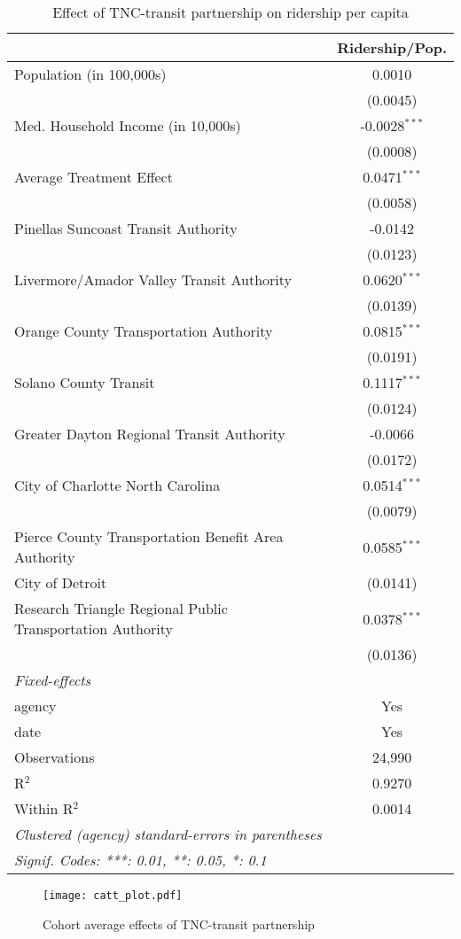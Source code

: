 \documentclass [12pt]{report}
\begin{document}
\begin{table}[H]
\centering 
\tiny
\caption{Effect of TNC-transit partnership on ridership per capita}
\begin{tabular}{lc}
   \tabularnewline \midrule
   \midrule
   & Ridership/Pop. \\   
   \midrule
   Population (in 100,000s) & 0.0010 \\
   & (0.0045)\\
   \midrule
   Med. Household Income (in 10,000s) & -0.0028$^{***}$ \\
   & (0.0008)\\
   \midrule
   Average Treatment Effect & 0.0471$^{***}$\\
   & (0.0058)\\
   \midrule
   Pinellas Suncoast Transit Authority & -0.0142\\   
   & (0.0123) \\   
   \midrule
   Livermore/Amador Valley Transit Authority & 0.0620$^{***}$ \\   
   & (0.0139) \\   
   \midrule
   Orange County Transportation Authority & 0.0815$^{***}$ \\   
   & (0.0191) \\   
   \midrule
   Solano County Transit & 0.1117$^{***}$ \\   
   & (0.0124)\\   
   \midrule
   Greater Dayton Regional Transit Authority & -0.0066 \\   
   & (0.0172)\\  
   \midrule
   City of Charlotte North Carolina & 0.0514$^{***}$ \\   
   & (0.0079) \\   
   \midrule
   Pierce County Transportation Benefit Area Authority & 0.0585$^{***}$ \\   
   City of Detroit & (0.0141) \\   
   \midrule
   Research Triangle Regional Public Transportation Authority & 0.0378$^{***}$\\   
   & (0.0136) \\    
   \midrule
   \multicolumn{1}{l}{\emph{Fixed-effects}} & \\
   agency & Yes \\  
   date & Yes \\   
   \midrule
   Observations              & 24,990\\  
   R$^2$                     & 0.9270\\  
   Within R$^2$              & 0.0014\\  
   \midrule \midrule
   \multicolumn{1}{l}{\emph{Clustered (agency) standard-errors in parentheses}}\\
   \multicolumn{1}{l}{\emph{Signif. Codes: ***: 0.01, **: 0.05, *: 0.1}}\\
\end{tabular}
\end{table}
\begin{figure}[H]
    \centering
    \texttt{[image: catt\_plot.pdf]} %
    \caption{Cohort average effects of TNC-transit partnership}
\end{figure}
\end{document}
